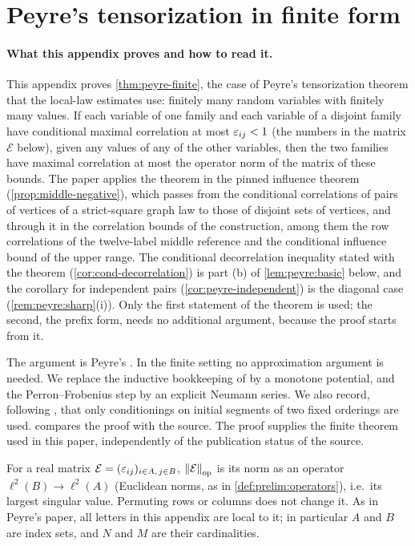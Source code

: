 
\section{Peyre's tensorization in finite form}\label{app:peyre}

\paragraph{What this appendix proves and how to read it.}
This appendix proves \cref{thm:peyre-finite}, the case of Peyre's
tensorization theorem \cite[Theorem~3.3.1]{Peyre} that the local-law
estimates use: finitely many random variables with finitely many values. If
each variable of one family and each variable of a disjoint
family have conditional maximal correlation at most
$\varepsilon_{ij}<1$ (the numbers in the matrix $\mathcal E$ below),
given any values of any of the other variables, then the two
families have maximal correlation at most the
operator norm of the matrix of these bounds. The paper applies the theorem
in the pinned influence theorem (\cref{prop:middle-negative}), which passes
from the conditional correlations of pairs of vertices of a strict-square
graph law to those of disjoint sets of vertices, and through it in the
correlation bounds of the construction, among them the row correlations of
the twelve-label middle reference and the conditional influence bound of the
upper range. The conditional decorrelation inequality stated with the
theorem (\cref{cor:cond-decorrelation}) is part (b) of \cref{lem:peyre:basic}
below, and the corollary for independent pairs (\cref{cor:peyre-independent})
is the diagonal case (\cref{rem:peyre:sharp}(i)). Only the first statement of
the theorem is used; the second, the prefix form, needs no additional argument, because the
proof starts from it.

The argument is Peyre's \cite[\S3.3.a]{Peyre}. In the finite setting no
approximation argument is needed. We replace the inductive bookkeeping of
\cite[Lemma~3.3.7]{Peyre} by a monotone potential, and the Perron--Frobenius
step \cite[Lemma~3.8.1]{Peyre} by an explicit Neumann series. We also record,
following \cite[\S3.4.a]{Peyre}, that only conditionings on initial segments
of two fixed orderings are used.  compares the proof
with the source. The proof supplies the finite theorem used in this paper,
independently of the publication status of the source.

For a real matrix $\mathcal E=(\varepsilon_{ij})_{i\in A,\,j\in B}$,
$\left\|\mathcal E\right\|_{\mathrm{op}}$ is its norm as an operator $\ell^2(B)\to\ell^2(A)$
(Euclidean norms, as in \cref{def:prelim:operators}), i.e.\ its largest
singular value. Permuting rows or columns does not change it. As in Peyre's
paper, all letters in this appendix are local to it; in particular $A$ and
$B$ are index sets, and $N$ and $M$ are their cardinalities.

